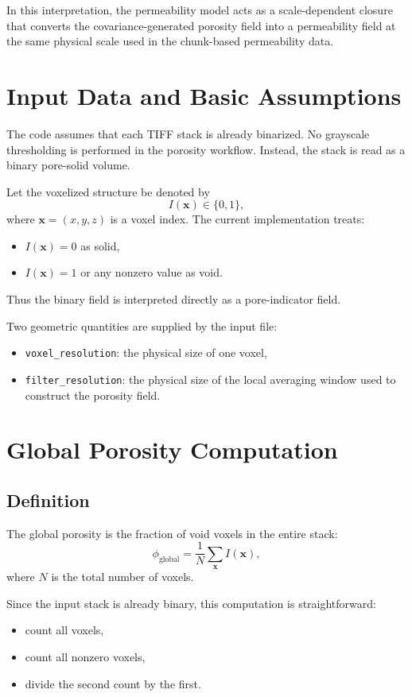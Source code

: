 \documentclass[11pt]{article}
\begin{document}
In this interpretation, the permeability model acts as a scale-dependent closure
that converts the covariance-generated porosity field into a permeability field
at the same physical scale used in the chunk-based permeability data.

\section{Input Data and Basic Assumptions}
The code assumes that each TIFF stack is already binarized. No grayscale
thresholding is performed in the porosity workflow. Instead, the stack is read
as a binary pore-solid volume.

Let the voxelized structure be denoted by
\[
I(\bm{x}) \in \{0,1\},
\]
where \(\bm{x} = (x,y,z)\) is a voxel index. The current implementation treats:
\begin{itemize}
\item \(I(\bm{x}) = 0\) as solid,
\item \(I(\bm{x}) = 1\) or any nonzero value as void.
\end{itemize}

Thus the binary field is interpreted directly as a pore-indicator field.

Two geometric quantities are supplied by the input file:
\begin{itemize}
\item \texttt{voxel\_resolution}: the physical size of one voxel,
\item \texttt{filter\_resolution}: the physical size of the local averaging
window used to construct the porosity field.
\end{itemize}

\section{Global Porosity Computation}
\subsection{Definition}
The global porosity is the fraction of void voxels in the entire stack:
\[
\phi_{\mathrm{global}}
=
\frac{1}{N}
\sum_{\bm{x}} I(\bm{x}),
\]
where \(N\) is the total number of voxels.

Since the input stack is already binary, this computation is straightforward:
\begin{itemize}
\item count all voxels,
\item count all nonzero voxels,
\item divide the second count by the first.
\end{itemize}
\end{document}
